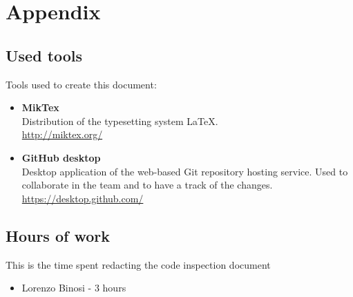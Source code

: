 \section{Appendix}

\subsection {Used tools}
Tools used to create this document:
\begin{itemize}
	\item \textbf{MikTex} \\ Distribution of the typesetting system LaTeX. \\ \url{http://miktex.org/} 
	\item \textbf{GitHub desktop}\\ Desktop application of the web-based Git repository hosting service. Used to collaborate in the team and to have a track of the changes.  \\ \url{https://desktop.github.com/} 
\end{itemize}

\subsection{Hours of work}
This is the time spent redacting the code inspection document
\begin{itemize}
	\item {Lorenzo Binosi} - 3 hours
\end{itemize}
